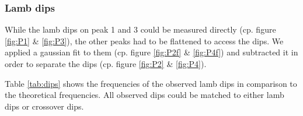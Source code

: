 
\newpage
\subsubsection{Lamb dips}

While the lamb dips on peak 1 and 3 could be measured directly (cp. figure \ref{fig:P1} \& \ref{fig:P3}), the other peaks had to be flattened to access the dips. We applied a gaussian fit to them  (cp. figure \ref{fig:P2f} \& \ref{fig:P4f}) and subtracted it in order to separate the dips (cp. figure \ref{fig:P2} \& \ref{fig:P4}).

Table \ref{tab:dips} shows the frequencies of the observed lamb dips in comparison to the theoretical frequencies. All observed dips could be matched to either lamb dips or crossover dips.

